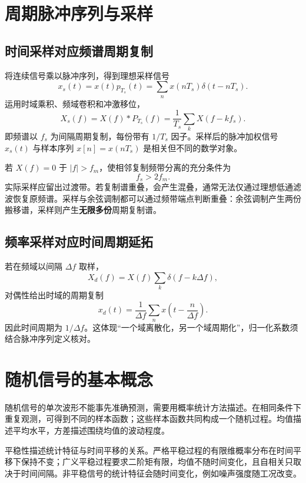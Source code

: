 \Needspace{8cm}
\section{周期脉冲序列与采样}


\subsection{时间采样对应频谱周期复制}

将连续信号乘以脉冲序列，得到理想采样信号
\[
x_s(t)=x(t)p_{T_s}(t)=\sum_nx(nT_s)\delta(t-nT_s).
\]
运用时域乘积、频域卷积和冲激移位，
\[
X_s(f)=X(f)*P_{T_s}(f)=\frac{1}{T_s}\sum_kX(f-kf_s).
\]
即频谱以 $f_s$ 为间隔周期复制，每份带有 $1/T_s$ 因子。采样后的脉冲加权信号 $x_s(t)$ 与样本序列 $x[n]=x(nT_s)$ 是相关但不同的数学对象。

若 $X(f)=0$ 于 $|f|>f_m$，使相邻复制频带分离的充分条件为
\[
f_s>2f_m.
\]
实际采样应留出过渡带。若复制谱重叠，会产生混叠，通常无法仅通过理想低通滤波恢复原频谱。采样与余弦调制都可以通过频带端点判断重叠：余弦调制产生两份搬移谱，采样则产生\textbf{无限多份}周期复制谱。

\subsection{频率采样对应时间周期延拓}

若在频域以间隔 $\Delta f$ 取样，
\[
X_d(f)=X(f)\sum_k\delta(f-k\Delta f),
\]
对偶性给出时域的周期复制
\[
x_d(t)=\frac{1}{\Delta f}\sum_nx\left(t-\frac{n}{\Delta f}\right).
\]
因此时间周期为 $1/\Delta f$。这体现“一个域离散化，另一个域周期化”，归一化系数须结合脉冲序列定义核对。

\Needspace{6cm}
\section{随机信号的基本概念}

随机信号的单次波形不能事先准确预测，需要用概率统计方法描述。在相同条件下重复观测，可得到不同的样本函数；这些样本函数共同构成一个随机过程。均值描述平均水平，方差描述围绕均值的波动程度。

平稳性描述统计特征与时间平移的关系。严格平稳过程的有限维概率分布在时间平移下保持不变；广义平稳过程要求二阶矩有限，均值不随时间变化，且自相关只取决于时间间隔。非平稳信号的统计特征会随时间变化，例如噪声强度随工况改变。

